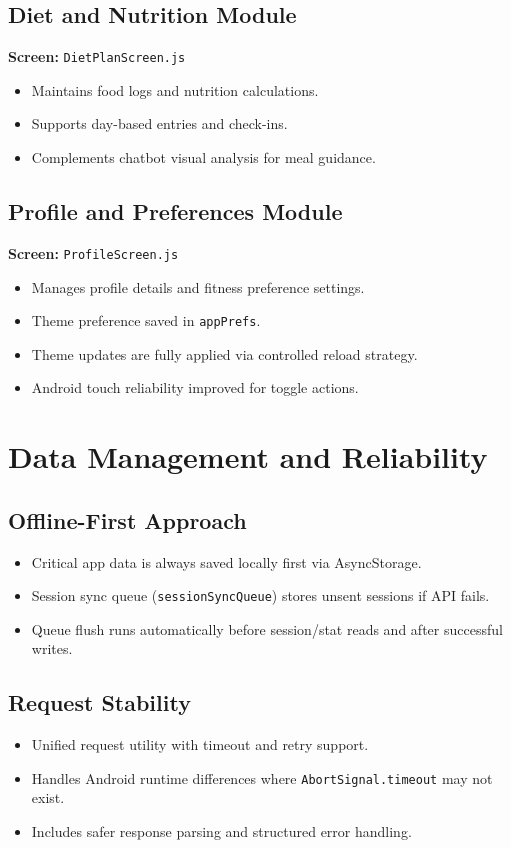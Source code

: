 \documentclass[12pt,a4paper]{article}
\begin{document}
\subsection{Diet and Nutrition Module}
\textbf{Screen:} \texttt{DietPlanScreen.js}
\begin{itemize}[leftmargin=1.2cm]
  \item Maintains food logs and nutrition calculations.
  \item Supports day-based entries and check-ins.
  \item Complements chatbot visual analysis for meal guidance.
\end{itemize}

\subsection{Profile and Preferences Module}
\textbf{Screen:} \texttt{ProfileScreen.js}
\begin{itemize}[leftmargin=1.2cm]
  \item Manages profile details and fitness preference settings.
  \item Theme preference saved in \texttt{appPrefs}.
  \item Theme updates are fully applied via controlled reload strategy.
  \item Android touch reliability improved for toggle actions.
\end{itemize}

\section{Data Management and Reliability}
\subsection{Offline-First Approach}
\begin{itemize}[leftmargin=1.2cm]
  \item Critical app data is always saved locally first via AsyncStorage.
  \item Session sync queue (\texttt{sessionSyncQueue}) stores unsent sessions if API fails.
  \item Queue flush runs automatically before session/stat reads and after successful writes.
\end{itemize}

\subsection{Request Stability}
\begin{itemize}[leftmargin=1.2cm]
  \item Unified request utility with timeout and retry support.
  \item Handles Android runtime differences where \texttt{AbortSignal.timeout} may not exist.
  \item Includes safer response parsing and structured error handling.
\end{itemize}
\end{document}
